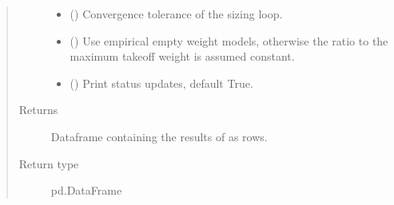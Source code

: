 \documentclass[letterpaper,10pt,english]{sphinxmanual}
\begin{document}
\begin{fulllineitems}
\begin{fulllineitems}
\begin{quote}
\begin{description}
\begin{itemize}
\item {} 
\sphinxAtStartPar
{} (\sphinxstyleliteralemphasis{\sphinxupquote{, }}) \textendash{} Convergence tolerance of the sizing loop.

\item {} 
\sphinxAtStartPar
{} (\sphinxstyleliteralemphasis{\sphinxupquote{, }}) \textendash{} Use empirical empty weight models, otherwise the ratio to the
maximum take\sphinxhyphen{}off weight is assumed constant.

\item {} 
\sphinxAtStartPar
{} (\sphinxstyleliteralemphasis{\sphinxupquote{, }}) \textendash{} Print status updates, default True.

\end{itemize}

\item[{Returns}] \leavevmode
\sphinxAtStartPar
Dataframe containing the results of {\hyperref[\detokenize{modules/helicopter:helicopter.Helicopter.sizing_loop}]{}} as rows.

\item[{Return type}] \leavevmode
\sphinxAtStartPar
pd.DataFrame

\end{description}\end{quote}

\end{fulllineitems}



\end{fulllineitems}
\end{document}
